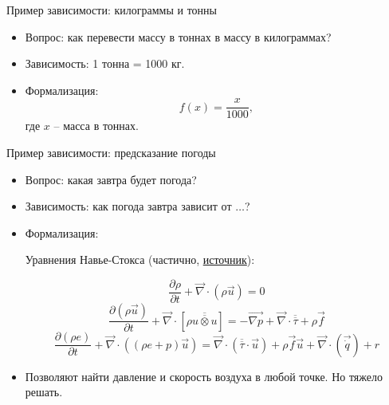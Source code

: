 \documentclass[c, handout]{beamer} %
\begin{document}
	\begin{frame}{Пример зависимости: килограммы и тонны}
		\begin{itemize}
			\item<1-> Вопрос: как перевести массу в тоннах в массу в килограммах?
			\item<2-> Зависимость: 1 тонна = 1000 кг.
			\item<2-> Формализация:
			\[
			f(x) = \dfrac{x}{1000},
			\] 
			где $x$ – масса в тоннах.
		\end{itemize}
	\end{frame}

	\begin{frame}{Пример зависимости: предсказание погоды}
		
		\begin{itemize}
			
		\item<1-> Вопрос: какая завтра будет погода? 
		
		\item<2-> Зависимость: как погода завтра зависит от $\ldots$?
		
		\item<3-> Формализация:
		
		Уравнения Навье-Стокса (частично, \href{https://latex.org/forum/viewtopic.php?t=22487}{источник}):
		
		\begin{equation}
		\frac{\partial \rho}{\partial t} + \overrightarrow{\nabla}\cdot(\rho\overrightarrow{u})=0 \end{equation}
		\begin{equation}
		\frac{\partial(\rho \overrightarrow{u})}{\partial t} + \overrightarrow{\nabla}\cdot[\rho\overline{\overline{u\otimes u}}] = -\overrightarrow{\nabla p} + \overrightarrow{\nabla}\cdot\overline{\overline{\tau}} + \rho\overrightarrow{f} \end{equation}
		\begin{equation}
		\frac{\partial(\rho e)}{\partial t} + \overrightarrow{\nabla}\cdot((\rho e + p)\overrightarrow{u}) = \overrightarrow{\nabla}\cdot(\overline{\overline{\tau}}\cdot\overrightarrow{u}) + \rho\overrightarrow{f}\overrightarrow{u} + \overrightarrow{\nabla}\cdot(\overrightarrow{\dot{q}})+r \end{equation}
		
		\item<3-> Позволяют найти давление и скорость воздуха в любой точке. Но тяжело решать. 
		\end{itemize}
		
	\end{frame}
\end{document}
